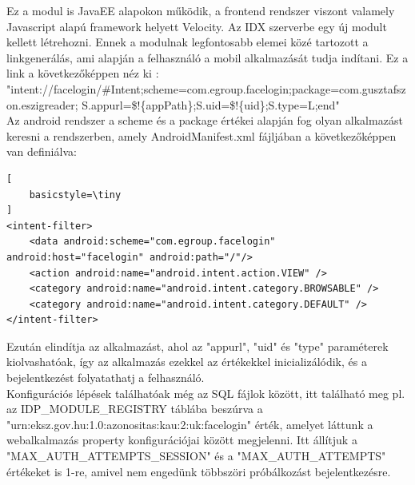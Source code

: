 Ez a modul is JavaEE alapokon működik, a frontend rendszer viszont valamely Javascript alapú framework helyett Velocity.
Az IDX szerverbe egy új modult kellett létrehozni. Ennek a modulnak legfontosabb elemei közé tartozott a linkgenerálás, ami alapján a felhasználó a mobil alkalmazását tudja indítani.
Ez a link a következőképpen néz ki : \\"intent://facelogin/\#Intent;scheme=com.egroup.facelogin;package=com.gusztafszon.eszigreader;
S.appurl=\$!\{appPath\};S.uid=\$!\{uid\};S.type=L;end"
\\ Az android rendszer a scheme és a package értékei alapján fog olyan alkalmazást keresni a rendszerben, amely AndroidManifest.xml fájljában a következőképpen van definiálva:
\begin{lstlisting}[
    basicstyle=\tiny
]
<intent-filter>
	<data android:scheme="com.egroup.facelogin" android:host="facelogin" android:path="/"/>
	<action android:name="android.intent.action.VIEW" />
	<category android:name="android.intent.category.BROWSABLE" />
	<category android:name="android.intent.category.DEFAULT" />
</intent-filter>
\end{lstlisting}

Ezután elindítja az alkalmazást, ahol az "appurl", "uid" és "type" paraméterek kiolvashatóak, így az alkalmazás ezekkel az értékekkel inicializálódik, és a bejelentkezést folyatathatj a felhasználó.
\\Konfigurációs lépések találhatóak még az SQL fájlok között, itt található meg pl. az IDP\_MODULE\_REGISTRY táblába beszúrva a "urn:eksz.gov.hu:1.0:azonositas:kau:2:uk:facelogin" érték, amelyet láttunk a webalkalmazás property konfigurációjai között megjelenni. Itt állítjuk a "MAX\_AUTH\_ATTEMPTS\_SESSION" és a "MAX\_AUTH\_ATTEMPTS" értékeket is 1-re, amivel nem engedünk többszöri próbálkozást bejelentkezésre.

